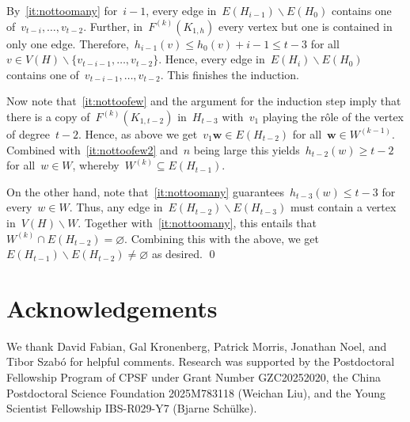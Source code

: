 \documentclass[oneside, 12pt]{amsart}
\numberwithin{equation}{section}
\numberwithin{figure}{section}
\let\emptyset=\varnothing
\let\setminus=\smallsetminus
\theoremstyle{plain}
\theoremstyle{note}
\theoremstyle{remark}
\begin{document}
    By~\eqref{it:nottoomany} for~$i-1$, every edge in~$E(H_{i-1})\setminus E(H_0)$ contains one of~$v_{t-i},\dots,v_{t-2}$. 
    Further, in~$F^{(k)}(K_{1,h})$ every vertex but one is contained in only one edge.
    Therefore,~$h_{i-1}(v)\leq h_0(v)+i-1\leq t-3$ for all~$v\in V(H)\setminus\{v_{t-i-1},\dots,v_{t-2}\}$.
    Hence, every edge in~$E(H_i)\setminus E(H_0)$ contains one of~$v_{t-i-1},\dots,v_{t-2}$.
    This finishes the induction.

    Now note that~\eqref{it:nottoofew} and the argument for the induction step imply that there is a copy of~$F^{(k)}(K_{1,t-2})$ in~$H_{t-3}$ with~$v_1$ playing the r\^ole of the vertex of degree~$t-2$.
    Hence, as above we get~$v_1\mathbf{w}\in E(H_{t-2})$ for all~$\mathbf{w}\in W^{(k-1)}$.
    Combined with~\eqref{it:nottoofew2} and~$n$ being large this yields~$h_{t-2}(w)\geq t-2$ for all~$w\in W$, whereby~$W^{(k)}\subseteq E(H_{t-1})$.
    
    On the other hand, note that~\eqref{it:nottoomany} guarantees~$h_{t-3}(w)\leq t-3$ for every~$w\in W$.
    Thus, any edge in~$E(H_{t-2})\setminus E(H_{t-3})$ must contain a vertex in~$V(H)\setminus W$.
    Together with~\eqref{it:nottoomany}, this entails that~$W^{(k)}\cap E(H_{t-2})=\emptyset$.
    Combining this with the above, we get~$E(H_{t-1})\setminus E(H_{t-2})\neq\emptyset$ as desired.
	\qed
    
	
	\section*{Acknowledgements}
    We thank David Fabian, Gal Kronenberg, Patrick Morris, Jonathan Noel, and Tibor Szab\'o for helpful comments.
	Research was supported by the Postdoctoral Fellowship Program of CPSF under Grant Number GZC20252020, the China Postdoctoral Science Foundation 2025M783118 (Weichan Liu), and the Young Scientist Fellowship IBS-R029-Y7 (Bjarne Sch\"ulke).
	
\end{document}
